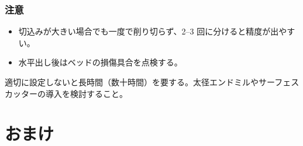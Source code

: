 \documentclass[uplatex,dvipdfmx]{ujarticle}
\begin{document}
\subsubsection*{注意}
\begin{itemize}
  \item 切込みが大きい場合でも一度で削り切らず、2--3 回に分けると精度が出やすい。
  \item 水平出し後はベッドの損傷具合を点検する。
\end{itemize}

適切に設定しないと長時間（数十時間）を要する。太径エンドミルやサーフェスカッターの導入を検討すること。

\section{おまけ}
\end{document}
